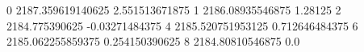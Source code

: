 0 2187.359619140625 2.551513671875
1 2186.08935546875 1.28125
2 2184.775390625 -0.03271484375
4 2185.520751953125 0.712646484375
6 2185.062255859375 0.254150390625
8 2184.80810546875 0.0
